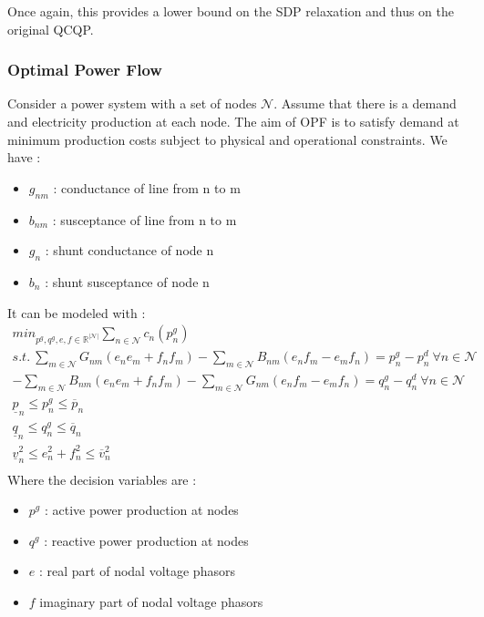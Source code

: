 \documentclass[../main.tex]{subfiles}
\begin{document}
Once again, this provides a lower bound on the SDP relaxation and thus on the original QCQP.\\

\subsubsection{Optimal Power Flow}
Consider a power system with a set of nodes $\mathcal{N}$. Assume that there is a demand and electricity production at each node. The aim of OPF is to satisfy demand at minimum production costs subject to physical and operational constraints. We have : \begin{itemize}
    \item $g_{nm}$ : conductance of line from n to m
    \item $b_{nm}$ : susceptance of line from n to m
    \item $g_n$ : shunt conductance of node n
    \item $b_n$ : shunt susceptance of node n
\end{itemize}

It can be modeled with : \\
$\begin{matrix}
    min_{p^g, q^g, e, f\in \mathbb{R}^{\lvert \mathcal{N} \rvert}} \sum_{n\in\mathcal{N}} c_n (p_n^g)\\
    s.t. \: \sum_{m\in \mathcal{N}} G_{nm}(e_n e_m + f_nf_m) - \sum_{m\in \mathcal{N}} B_{nm} (e_n f_m - e_mf_n) = p_n^g - p_n^d \: \forall n \in \mathcal{N}\\
    -\sum_{m\in \mathcal{N}} B_{nm}(e_n e_m + f_nf_m) - \sum_{m\in \mathcal{N}} G_{nm} (e_n f_m - e_mf_n) = q_n^g - q_n^d \: \forall n \in \mathcal{N}\\
    \underline{p}_n \leq p_n^g \leq \overline{p}_n\\
    \underline{q}_n \leq q_n^g \leq \overline{q}_n\\
    \underline{v}_n^2 \leq e_n^2 + f_n^2 \leq \overline{v}_n^2\\
\end{matrix}$
Where the decision variables are : \begin{itemize}
    \item $p^g$ : active power production at nodes
    \item $q^g$ : reactive power production at nodes
    \item $e$ : real part of nodal voltage phasors
    \item $f$ imaginary part of nodal voltage phasors
\end{itemize}
\end{document}
